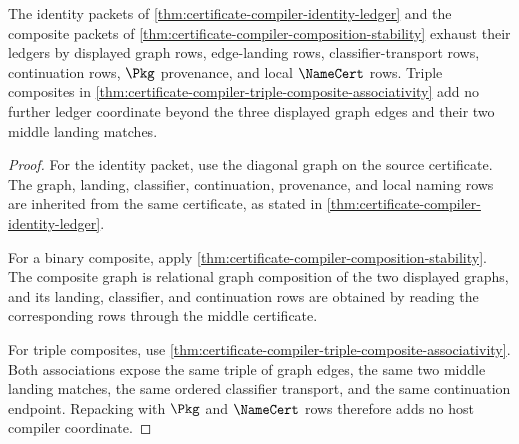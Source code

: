 \begin{theorem}
\label{thm:certificate-compiler-identity-composite-ledger-exhaustion}
The identity packets of \autoref{thm:certificate-compiler-identity-ledger} and the composite packets of \autoref{thm:certificate-compiler-composition-stability} exhaust their ledgers by displayed graph rows, edge-landing rows, classifier-transport rows, continuation rows, $\Pkg$ provenance, and local $\NameCert$ rows. Triple composites in \autoref{thm:certificate-compiler-triple-composite-associativity} add no further ledger coordinate beyond the three displayed graph edges and their two middle landing matches.
\end{theorem}
\begin{proof}
For the identity packet, use the diagonal graph on the source certificate. The graph, landing, classifier, continuation, provenance, and local naming rows are inherited from the same certificate, as stated in \autoref{thm:certificate-compiler-identity-ledger}.

For a binary composite, apply \autoref{thm:certificate-compiler-composition-stability}. The composite graph is relational graph composition of the two displayed graphs, and its landing, classifier, and continuation rows are obtained by reading the corresponding rows through the middle certificate.

For triple composites, use \autoref{thm:certificate-compiler-triple-composite-associativity}. Both associations expose the same triple of graph edges, the same two middle landing matches, the same ordered classifier transport, and the same continuation endpoint. Repacking with $\Pkg$ and $\NameCert$ rows therefore adds no host compiler coordinate.
\end{proof}

